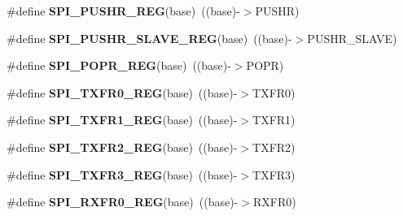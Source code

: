 \begin{DoxyCompactItemize}
\item 
\#define {\bfseries S\+P\+I\+\_\+\+P\+U\+S\+H\+R\+\_\+\+R\+EG}(base)~((base)-\/$>$P\+U\+S\+HR)\hypertarget{group__SPI__Register__Accessor__Macros_gaa72e13724179a2f797827085b3ff1277}{}\label{group__SPI__Register__Accessor__Macros_gaa72e13724179a2f797827085b3ff1277}

\item 
\#define {\bfseries S\+P\+I\+\_\+\+P\+U\+S\+H\+R\+\_\+\+S\+L\+A\+V\+E\+\_\+\+R\+EG}(base)~((base)-\/$>$P\+U\+S\+H\+R\+\_\+\+S\+L\+A\+VE)\hypertarget{group__SPI__Register__Accessor__Macros_ga471bc13ac366b823f456b69188afeedf}{}\label{group__SPI__Register__Accessor__Macros_ga471bc13ac366b823f456b69188afeedf}

\item 
\#define {\bfseries S\+P\+I\+\_\+\+P\+O\+P\+R\+\_\+\+R\+EG}(base)~((base)-\/$>$P\+O\+PR)\hypertarget{group__SPI__Register__Accessor__Macros_gaf79eb9413589dba11d328fbee52c1716}{}\label{group__SPI__Register__Accessor__Macros_gaf79eb9413589dba11d328fbee52c1716}

\item 
\#define {\bfseries S\+P\+I\+\_\+\+T\+X\+F\+R0\+\_\+\+R\+EG}(base)~((base)-\/$>$T\+X\+F\+R0)\hypertarget{group__SPI__Register__Accessor__Macros_ga055ab0396fbd2b7e079ffa0df55110a5}{}\label{group__SPI__Register__Accessor__Macros_ga055ab0396fbd2b7e079ffa0df55110a5}

\item 
\#define {\bfseries S\+P\+I\+\_\+\+T\+X\+F\+R1\+\_\+\+R\+EG}(base)~((base)-\/$>$T\+X\+F\+R1)\hypertarget{group__SPI__Register__Accessor__Macros_ga9c7d3fda087668b4cb29054741f99d2f}{}\label{group__SPI__Register__Accessor__Macros_ga9c7d3fda087668b4cb29054741f99d2f}

\item 
\#define {\bfseries S\+P\+I\+\_\+\+T\+X\+F\+R2\+\_\+\+R\+EG}(base)~((base)-\/$>$T\+X\+F\+R2)\hypertarget{group__SPI__Register__Accessor__Macros_ga52c17a1852eb3b3e60d3204900a35f4f}{}\label{group__SPI__Register__Accessor__Macros_ga52c17a1852eb3b3e60d3204900a35f4f}

\item 
\#define {\bfseries S\+P\+I\+\_\+\+T\+X\+F\+R3\+\_\+\+R\+EG}(base)~((base)-\/$>$T\+X\+F\+R3)\hypertarget{group__SPI__Register__Accessor__Macros_ga6a2eb75190dd107d3cc223f886bcf370}{}\label{group__SPI__Register__Accessor__Macros_ga6a2eb75190dd107d3cc223f886bcf370}

\item 
\#define {\bfseries S\+P\+I\+\_\+\+R\+X\+F\+R0\+\_\+\+R\+EG}(base)~((base)-\/$>$R\+X\+F\+R0)\hypertarget{group__SPI__Register__Accessor__Macros_ga2d4672afa128ec2ea1dd170a6c88f205}{}\label{group__SPI__Register__Accessor__Macros_ga2d4672afa128ec2ea1dd170a6c88f205}


\end{DoxyCompactItemize}
